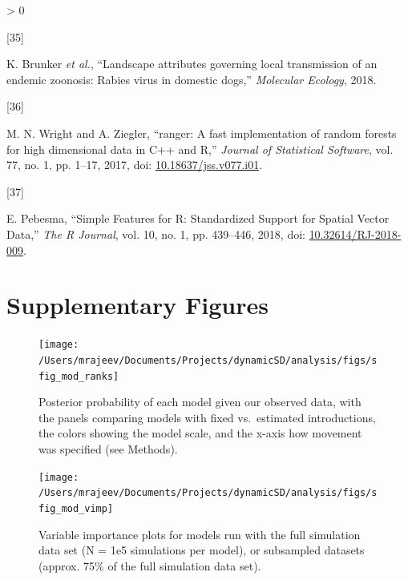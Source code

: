 \documentclass[
  oneside]{book}
\newcommand{\beginsupplement}{
  \setcounter{table}{0}  
  \renewcommand{\thetable}{S\arabic{chapter}.\arabic{table}} 
  \setcounter{figure}{0} 
  \renewcommand{\thefigure}{S\arabic{chapter}.\arabic{figure}}
}
\newlength{\cslhangindent}
\newlength{\csllabelwidth}
\newenvironment{CSLReferences}[2] %
 {%
  \setlength{\parindent}{0pt}
  \ifodd #1 \everypar{\setlength{\hangindent}{\cslhangindent}}\ignorespaces\fi
  \ifnum #2 > 0
  \setlength{\parskip}{#2\baselineskip}
  \fi
 }%
 {}
\newcommand{\CSLLeftMargin}[1]{\parbox[t]{\csllabelwidth}{#1}}
\newcommand{\CSLRightInline}[1]{\parbox[t]{\linewidth - \csllabelwidth}{#1}\break}
\begin{document}
\begin{CSLReferences}{0}{0}
\leavevmode\hypertarget{ref-brunker2018}{}%
\CSLLeftMargin{{[}35{]} }
\CSLRightInline{K. Brunker \emph{et al.}, {``Landscape attributes governing local transmission of an endemic zoonosis: Rabies virus in domestic dogs,''} \emph{Molecular Ecology}, 2018.}

\leavevmode\hypertarget{ref-ranger2017}{}%
\CSLLeftMargin{{[}36{]} }
\CSLRightInline{M. N. Wright and A. Ziegler, {``{ranger}: A fast implementation of random forests for high dimensional data in {C++} and {R},''} \emph{Journal of Statistical Software}, vol. 77, no. 1, pp. 1--17, 2017, doi: \href{https://doi.org/10.18637/jss.v077.i01}{10.18637/jss.v077.i01}.}

\leavevmode\hypertarget{ref-sf2018}{}%
\CSLLeftMargin{{[}37{]} }
\CSLRightInline{E. Pebesma, {``{Simple Features for R: Standardized Support for Spatial Vector Data},''} \emph{{The R Journal}}, vol. 10, no. 1, pp. 439--446, 2018, doi: \href{https://doi.org/10.32614/RJ-2018-009}{10.32614/RJ-2018-009}.}

\end{CSLReferences}

\newpage

\hypertarget{supplementary-figures-1}{%
\section{Supplementary Figures}\label{supplementary-figures-1}}

\beginsupplement

\setlength{\parskip}{2em}

\begin{figure}
\texttt{[image: /Users/mrajeev/Documents/Projects/dynamicSD/analysis/figs/sfig\_mod\_ranks]} \caption[Posterior probability of models given observed data.]{Posterior probability of each model given our observed data, with the panels comparing models with fixed vs.~estimated introductions, the colors showing the model scale, and the x-axis how movement was specified (see Methods).}\label{fig:sfig-mod-ranks}
\end{figure}



\begin{figure}
\texttt{[image: /Users/mrajeev/Documents/Projects/dynamicSD/analysis/figs/sfig\_mod\_vimp]} \caption[Variable importance plots for parameters with full or subsampled simulations.]{Variable importance plots for models run with the full simulation data set (N = 1e5 simulations per model), or subsampled datasets (approx. 75\% of the full simulation data set).}\label{fig:sfig-mod-vimp}
\end{figure}
\end{document}
